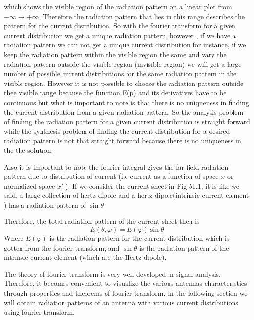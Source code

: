 which shows the visible region of the radiation pattern on a linear plot from $-\infty\to +\infty$. Therefore the radiation pattern that lies in this range describes the pattern for the current distribution. So with the fourier transform for a given current distribution we get a unique radiation pattern, however , if we have a radiation pattern we can not get a unique current distribution for instance, if we keep the radiation pattern within the visible region the same and vary the radiation pattern outside the visible region (invisible region) we will get a large number of possible current distributions for the same radiation pattern in the visible region. However it is not possible to choose the radiation pattern outside thee visible range because the function E(p) and its derivatives have to be continuous but what is important to note is that there is no uniqueness in finding the current distribution from a given radiation pattern. So the analysis problem of finding the radiation pattern for a given current distribution is straight forward while the synthesis problem of finding the current distribution for  a desired radiation pattern is not that straight forward because there is no uniqueness in the the solution.

Also it is important to note the fourier integral gives the far field radiation pattern due to distribution of current (i.e current as a function of space $x$ or normalized space $x'$ ). If we consider the current sheet in Fig 51.1, it is like we said, a large collection of hertz dipole and a hertz dipole(intrinsic current element ) has a radiation pattern of $\sin\theta$

Therefore, the total radiation pattern of the current sheet then
is $$E(\theta, \varphi) = E(\varphi)\sin\theta$$
Where $E(\varphi)$ is the radiation pattern for the current distribution which is gotten from the fourier transform, and $\sin\theta$ is the radiation pattern of the intrinsic current element (which are the Hertz dipole).

The theory of fourier transform is very well developed in signal analysis. Therefore, it becomes convenient to visualize the various antennas characteristics through properties and theorems of fourier transform. In the following section we will obtain radiation patterns of an antenna with various current distributions using fourier transform.

